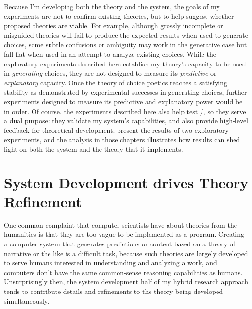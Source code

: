 Because I'm developing both the theory and the system, the goals of my experiments are not to confirm existing theories, but to help suggest whether proposed theories are viable.
%
For example, although grossly incomplete or misguided theories will fail to produce the expected results when used to generate choices, some subtle confusions or ambiguity may work in the generative case but fall flat when used in an attempt to analyze existing choices.
%
While the exploratory experiments described here establish my theory's capacity to be used in \emph{generating} choices, they are not designed to measure its \emph{predictive} or \emph{explanatory} capacity.
%
Once the theory of choice poetics reaches a satisfying stability as demonstrated by experimental successes in generating choices, further experiments designed to measure its predictive and explanatory power would be in order.
%
Of course, the experiments described here also help test \dunyazad/, so they serve a dual purpose: they validate my system's capabilities, and also provide high-level feedback for theoretical development.
%
 present the results of two exploratory experiments, and the analysis in those chapters illustrates how results can shed light on both the system and the theory that it implements.

\section{System Development drives Theory Refinement}


One common complaint that computer scientists have about theories from the humanities is that they are too vague to be implemented as a program.
%
Creating a computer system that generates predictions or content based on a theory of narrative or the like is a difficult task, because such theories are largely developed to serve humans interested in understanding and analyzing a work, and computers don't have the same common-sense reasoning capabilities as humans.
%
Unsurprisingly then, the system development half of my hybrid research approach tends to contribute details and refinements to the theory being developed simultaneously.


